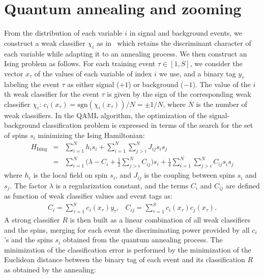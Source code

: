 \documentclass{article}
\begin{document}
\section{Quantum annealing and zooming}
\label{s:qamlz}

From the distribution of each variable $i$ in signal and background events,
we construct a weak classifier $\chi_i$ as in~\cite{nature} which retains
the discriminant character of each variable while adapting it to an annealing
process. We then construct an Ising problem as follows. For each training event
$\tau \in [1,S]$, we consider the vector $x_{\tau}$ of the values of each variable
of index $i$ we use, and a binary tag $y_{\tau}$ labeling the event $\tau$ as
either signal ($+1$) or background ($-1$). The value of the $i$th weak classifier
for the event $\tau$ is given by the sign of the corresponding weak classifier
$\chi_i$: $c_i(x_{\tau})=\mathrm{sgn}(\chi_i(x_{\tau}))/N=\pm1/N$, where $N$ is the number
of weak classifiers. In the QAML algorithm, the optimization of the signal-background 
classification problem is expressed in terms of the search for the set of spins
$s_i$ minimizing the Ising Hamiltonian:
\begin{eqnarray}
  H_{\mathrm{Ising}} & = & \sum\limits_{i=1}^{N} h_i s_i
  + \sum\limits_{i=1}^{N}\sum\limits_{j>i}^{N} J_{ij} s_i s_j \nonumber \\
  & = & \sum\limits_{i=1}^{N} \Big(\lambda - C_i + \frac{1}{2}\sum\limits_{j>i}^{N} C_{ij}\Big) s_i
  + \frac{1}{4}\sum\limits_{i=1}^{N}\sum\limits_{j>i}^{N} C_{ij} s_i s_j 
\label{eq:His}
\end{eqnarray}
where $h_i$ is the local field on spin $s_i$, and $J_{ij}$ is the coupling 
between spins $s_i$ and $s_j$. The factor $\lambda$ is a regularization constant, and 
the terms $C_i$ and $C_{ij}$ are defined as function of weak classifier 
values and event tags as:
\begin{eqnarray}
  C_{i} = \sum\limits_{\tau=1}^{S}c_i(x_{\tau})y_{\tau}, &
  C_{ij} = \sum\limits_{\tau=1}^{S}c_i(x_{\tau})c_j(x_{\tau}).
\label{eq:ci}
\end{eqnarray}
A strong classifier $R$ is then built as a linear combination of all weak 
classifiers and the spins, merging for each event the discriminating power 
provided by all $c_i$'s and the spins $s_i$ obtained from the quantum 
annealing process. The minimization of the classification error is 
performed by the minimization of the Euclidean distance between the binary 
tag of each event and its classification $R$ as obtained by the annealing:
\end{document}

